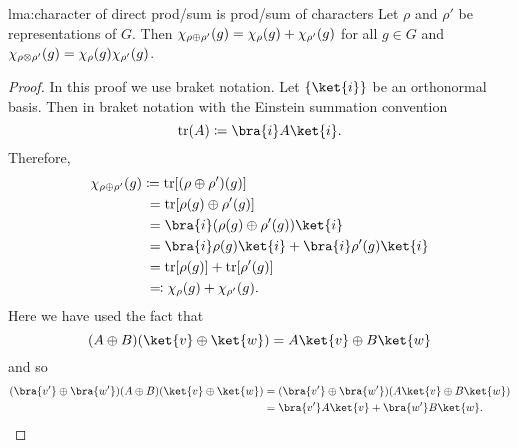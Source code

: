 \begin{lma}{}{lma:character of direct prod/sum is prod/sum of characters}
    Let \(\rho\) and \(\rho'\) be representations of \(G\).
    Then \(\chi_{\rho\oplus\rho'}(g) = \chi_\rho(g) + \chi_{\rho'}(g)\)
    for all \(g \in G\) and \(\chi_{\rho\otimes\rho'}(g) =
    \chi_\rho(g)\chi_{\rho'}(g)\).
    \begin{proof}
        In this proof we use braket notation.
        Let \(\{\ket{i}\}\) be an orthonormal basis.
        Then in braket notation with the Einstein summation convention
        \begin{equation}
            \tr(A) \coloneqq \bra{i}A\ket{i}.
        \end{equation}
        Therefore,
        \begin{align}
            \chi_{\rho\directsum\rho'}(g) &\coloneqq
            \tr[(\rho\directsum\rho')(g)]\\
            &\hphantom{:}= \tr[\rho(g)\directsum\rho'(g)]\\
            &\hphantom{:}= \bra{i}(\rho(g)\directsum\rho'(g))\ket{i}\\
            &\hphantom{:}= \bra{i}\rho(g)\ket{i} + \bra{i}\rho'(g)\ket{i}\\
            &\hphantom{:}= \tr[\rho(g)] + \tr[\rho'(g)]\\
            &\hphantom{:}\eqqcolon \chi_\rho(g) + \chi_{\rho'}(g).
        \end{align}
        Here we have used the fact that
        \begin{equation}
            (A \directsum B)(\ket{v} \directsum \ket{w}) = A\ket{v}
            \directsum B\ket{w}
        \end{equation}
        and so
        \begin{align}
            (\bra{v'} \directsum \bra{w'}) (A \directsum B) (\ket{v}
            \directsum \ket{w}) &= (\bra{v'} \directsum \bra{w'}) (A\ket{v} \directsum
            B\ket{w})\\
            &= \bra{v'}A\ket{v} + \bra{w'}B\ket{w}.
        \end{align}
        

\end{proof}
\end{lma}
